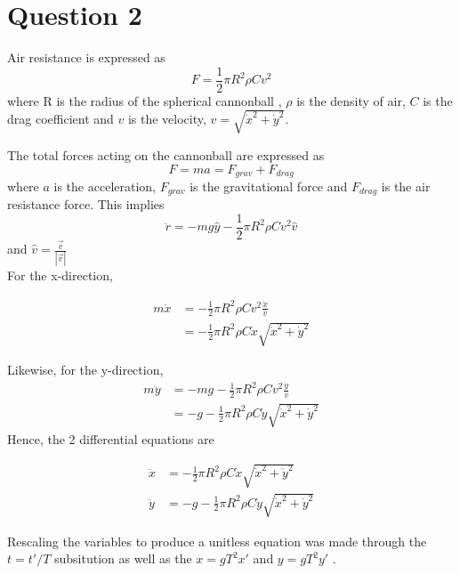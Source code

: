 \documentclass[11pt]{article}
\begin{document}
	




\section{Question 2}
Air resistance is expressed as 
\begin{equation}
	F = \frac{1}{2} \pi R^{2} \rho C v^2
\end{equation}
where R is the radius of the spherical cannonball , $\rho$ is the density of air, $C$ is the drag coefficient and $v$ is the velocity, $v = \sqrt{\dot{x}^2 + \dot{y}^2}$.

The total forces acting on the cannonball are expressed as
\begin{equation}
	F = ma = F_{grav} + F_{drag}
\end{equation}
where $a$ is the acceleration, $F_{grav}$ is the gravitational force and $F_{drag}$ is the air resistance force. This implies
\begin{equation}
	\ddot{r} = -mg \hat{y} - \frac{1}{2}\pi R^{2}\rho C v^{2} \hat{v}
\end{equation}
and $\hat{v} = \frac{\vec{v}}{\left | \vec{v} \right |}$ \\

For the x-direction,


\begin{align}
		m\ddot{x} & = -\frac{1}{2} \pi R^{2} \rho C v^2 \frac{\dot{x}}{v} \\
	& = -\frac{1}{2} \pi R^{2} \rho C \dot{x} \sqrt{\dot{x}^{2} + \dot{y}^{2}}
\end{align}
 
 Likewise, for the y-direction,
 \begin{align}
 	m\ddot{y} & = -mg -\frac{1}{2} \pi R^{2} \rho C v^2 \frac{\dot{y}}{v} \\
 	& = -g -\frac{1}{2} \pi R^{2} \rho C \dot{y} \sqrt{\dot{x}^{2} + \dot{y}^{2}}
 \end{align}
Hence, the 2 differential equations are

\begin{align}
	\ddot{x} & = -\frac{1}{2} \pi R^{2} \rho C \dot{x} \sqrt{\dot{x}^{2} + \dot{y}^{2}}\\
	\ddot{y} & = -g -\frac{1}{2} \pi R^{2} \rho C \dot{y} \sqrt{\dot{x}^{2} + \dot{y}^{2}}
\end{align}


Rescaling the variables to produce a unitless equation was made through the $t = t'/T$ subsitution as well as the $x = gT^{2} x'$ and $y = gT^{2} y'$ .  
\end{document}
